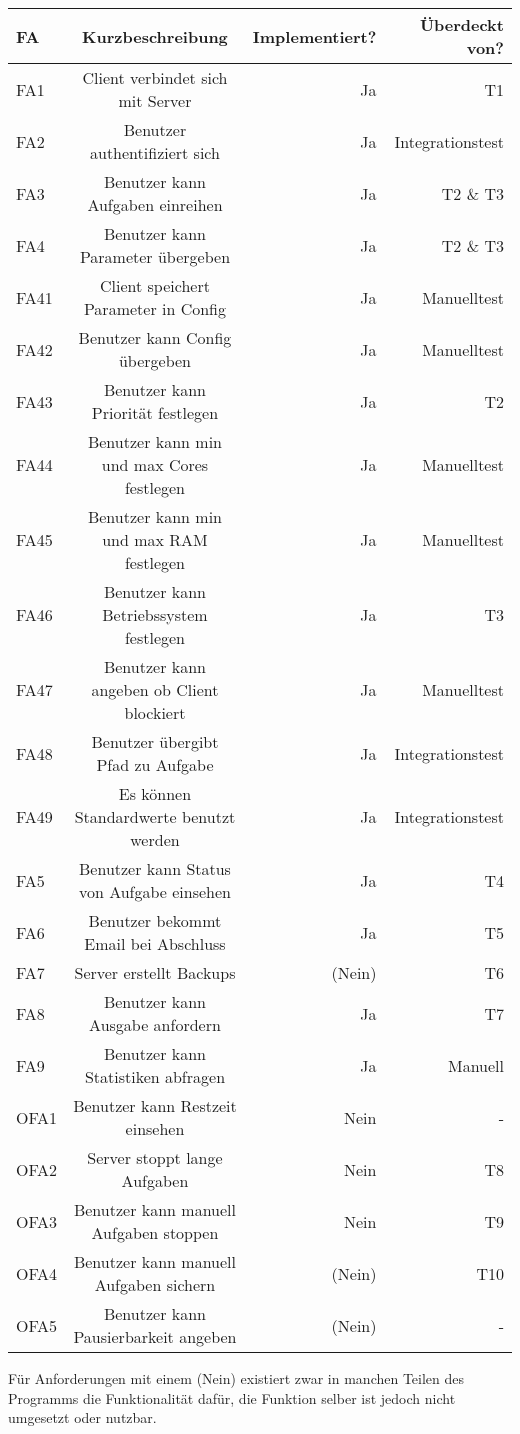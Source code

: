 \documentclass[a4paper,12pt]{article}
\begin{document}
\begin{tabular}{|l|c|r|r|}
	\hline
	FA & Kurzbeschreibung & Implementiert? & Überdeckt von? \\ \hline \hline
	FA1 & Client verbindet sich mit Server & Ja & T1\\ \hline
	FA2 & Benutzer authentifiziert sich & Ja & Integrationstest\\ \hline
	FA3 & Benutzer kann Aufgaben einreihen & Ja & T2 \& T3\\ \hline
	FA4 & Benutzer kann Parameter übergeben & Ja & T2 \& T3\\ \hline
	FA41 & Client speichert Parameter in Config & Ja & Manuelltest\\ \hline
	FA42 & Benutzer kann Config übergeben & Ja & Manuelltest\\ \hline
	FA43 & Benutzer kann Priorität festlegen & Ja & T2\\ \hline
	FA44 & Benutzer kann min und max Cores festlegen & Ja & Manuelltest\\ \hline
	FA45 & Benutzer kann min und max RAM festlegen & Ja & Manuelltest\\ \hline
	FA46 & Benutzer kann Betriebssystem festlegen & Ja & T3\\ \hline
	FA47 & Benutzer kann angeben ob Client blockiert & Ja & Manuelltest\\ \hline
	FA48 & Benutzer übergibt Pfad zu Aufgabe & Ja & Integrationstest\\ \hline
	FA49 & Es können Standardwerte benutzt werden & Ja & Integrationstest\\ \hline
	FA5 & Benutzer kann Status von Aufgabe einsehen & Ja & T4\\ \hline
	FA6 & Benutzer bekommt Email bei Abschluss & Ja & T5 \\ \hline
	FA7 & Server erstellt Backups & (Nein) & T6 \\ \hline
	FA8 & Benutzer kann Ausgabe anfordern & Ja & T7\\ \hline
	FA9 & Benutzer kann Statistiken abfragen & Ja & Manuell\\ \hline \hline
	OFA1 & Benutzer kann Restzeit einsehen & Nein & - \\ \hline
	OFA2 & Server stoppt lange Aufgaben & Nein & T8 \\ \hline
	OFA3 & Benutzer kann manuell Aufgaben stoppen & Nein & T9 \\ \hline
	OFA4 & Benutzer kann manuell Aufgaben sichern & (Nein) & T10 \\ \hline
	OFA5 & Benutzer kann Pausierbarkeit angeben & (Nein) & - \\ \hline
\end{tabular}
\newline \newline
Für Anforderungen mit einem (Nein) existiert zwar in manchen Teilen des Programms die Funktionalität dafür, die Funktion selber ist jedoch nicht umgesetzt oder nutzbar.
\end{document}
